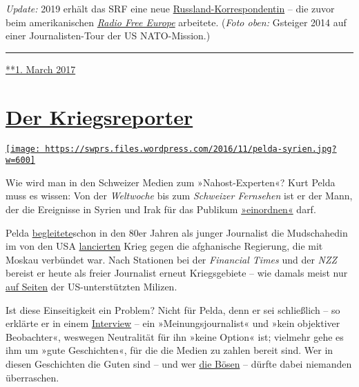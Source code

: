 \emph{Update:} 2019 erhält das SRF eine neue
\href{https://www.srgd.ch/de/aktuelles/news/2017/12/05/luzia-tschirky-wird-neue-russland-korrespondentin/}{Russland-Korrespondentin}
-- die zuvor beim amerikanischen
\href{https://de.wikipedia.org/wiki/Radio_Free_Europe}{\emph{Radio Free
Europe}} arbeitete. (\emph{Foto oben:} Gsteiger 2014 auf einer
Jour­na­­listen-​Tour der US NATO-Mission.)

\begin{center}\rule{0.5\linewidth}{\linethickness}\end{center}

\href{https://swprs.org/2017/03/01/der-korrespondent/}{**1. March 2017}

\hypertarget{der-kriegsreporter}{%
\section{\texorpdfstring{\href{https://swprs.org/2017/03/01/der-kriegsreporter/}{Der
Kriegsreporter}}{Der Kriegsreporter}}\label{der-kriegsreporter}}

\href{https://swprs.org/2017/03/01/der-kriegsreporter/}{\texttt{[image: https://swprs.files.wordpress.com/2016/11/pelda-syrien.jpg?w=600]}}

Wie wird man in den Schweizer Medien zum »Nahost-Experten«? Kurt Pelda
muss es wissen: Von der \emph{Welt­woche} bis zum \emph{Schwei­zer
Fern­se­hen} ist er der Mann, der die Ereig­nisse in Sy­ri­en und Irak
für das Publi­kum
\href{http://www.srf.ch/news/international/assad-ist-nur-noch-an-der-macht-weil-er-so-brutal-ist}{»ein­ord­nen«}
darf.

Pelda
\href{https://www.youtube.com/watch?v=dtV25eIECKY}{be­glei­tete}schon in
den 80er Jahren als junger Journa­list die Mudschahedin im von den USA
\href{https://www.voltairenet.org/article165889.html}{lancier­ten} Krieg
gegen die afgha­nische Regie­rung, die mit Moskau verbün­det war. Nach
Sta­tionen bei der \emph{Financial Times} und der \emph{NZZ} bereist er
heute als freier Journa­list erneut Kriegs­ge­biete -- wie damals meist
nur
\href{https://tageswoche.ch/politik/ein-basler-im-syrischen-kampfgebiet/}{auf
Seiten} der US-unter­stützten Milizen.

Ist diese Ein­seitig­keit ein Pro­blem? Nicht für Pelda, denn er sei
schließ­lich -- so erklärte er in einem
\href{https://www.tageswoche.ch/de/2014_36/international/667493/}{Interview}
-- ein »Mei­nungs­jour­na­list« und »kein objek­ti­ver Be­obach­ter«,
wes­wegen Neutra­li­tät für ihn »keine Option« ist; viel­mehr gehe es
ihm um »gute Ge­schich­ten«, für die die Medien zu zahlen be­reit sind.
Wer in diesen Ge­schich­ten die Guten sind -- und wer
\href{http://www.srf.ch/news/international/assad-ist-nur-noch-an-der-macht-weil-er-so-brutal-ist}{die
Bösen} -- dürf‌te dabei niemanden über­raschen.

